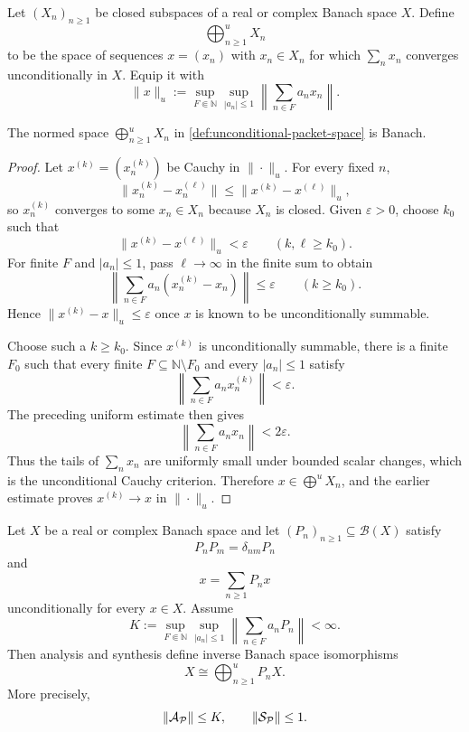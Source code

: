 \begin{definition}
\label{def:unconditional-packet-space}
Let $(X_n)_{n\geq1}$ be closed subspaces of a real or complex Banach space $X$.  Define
\[
\bigoplus_{n\geq1}^{u}X_n
\]
to be the space of sequences $x=(x_n)$ with $x_n\in X_n$ for which $\sum_nx_n$ converges unconditionally in $X$.  Equip it with
\[
\|x\|_u
:=
\sup_{F\Subset\mathbb N}
\sup_{|a_n|\leq1}
\left\|\sum_{n\in F}a_nx_n\right\|.
\]
\end{definition}

\begin{lemma}
\label{lem:unconditional-completeness}
The normed space $\bigoplus_{n\geq1}^{u}X_n$ in \cref{def:unconditional-packet-space} is Banach.
\end{lemma}

\begin{proof}
Let $x^{(k)}=(x_n^{(k)})$ be Cauchy in $\|\cdot\|_u$.  For every fixed $n$,
\[
\|x_n^{(k)}-x_n^{(\ell)}\|
\leq
\|x^{(k)}-x^{(\ell)}\|_u,
\]
so $x_n^{(k)}$ converges to some $x_n\in X_n$ because $X_n$ is closed.  Given $\varepsilon>0$, choose $k_0$ such that
\[
\|x^{(k)}-x^{(\ell)}\|_u<\varepsilon
\qquad(k,\ell\geq k_0).
\]
For finite $F$ and $|a_n|\leq1$, pass $\ell\to\infty$ in the finite sum to obtain
\[
\left\|\sum_{n\in F}a_n(x_n^{(k)}-x_n)\right\|
\leq\varepsilon
\qquad(k\geq k_0).
\]
Hence $\|x^{(k)}-x\|_u\leq\varepsilon$ once $x$ is known to be unconditionally summable.

Choose such a $k\geq k_0$.  Since $x^{(k)}$ is unconditionally summable, there is a finite $F_0$ such that every finite $F\subseteq\mathbb N\setminus F_0$ and every $|a_n|\leq1$ satisfy
\[
\left\|\sum_{n\in F}a_nx_n^{(k)}\right\|<\varepsilon.
\]
The preceding uniform estimate then gives
\[
\left\|\sum_{n\in F}a_nx_n\right\|<2\varepsilon.
\]
Thus the tails of $\sum_nx_n$ are uniformly small under bounded scalar changes, which is the unconditional Cauchy criterion.  Therefore $x\in\bigoplus^uX_n$, and the earlier estimate proves $x^{(k)}\to x$ in $\|\cdot\|_u$.
\end{proof}

\begin{theorem}
\label{thm:countable-packets}
Let $X$ be a real or complex Banach space and let $(P_n)_{n\geq1}\subseteq\mathcal B(X)$ satisfy
\[
P_nP_m=\delta_{nm}P_n
\]
and
\[
x=\sum_{n\geq1}P_nx
\]
unconditionally for every $x\in X$.  Assume
\[
K:=
\sup_{F\Subset\mathbb N}
\sup_{|a_n|\leq1}
\left\|\sum_{n\in F}a_nP_n\right\|<\infty.
\]
Then analysis and synthesis define inverse Banach space isomorphisms
\[
\boxed{
X\cong\bigoplus_{n\geq1}^{u}P_nX.
}
\]
More precisely,
\[
\|\mathcal A_{\mathcal P}\|\leq K,
\qquad
\|\mathcal S_{\mathcal P}\|\leq1.
\]
\end{theorem}

